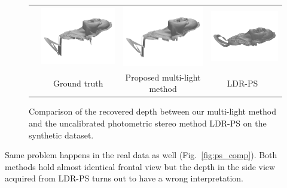 \begin{figure}[!ht]
{\begin{tabular}{c c c c}
   \multirow{-6}{*}{\parbox[t]{2.5mm}{}} &    
   \includegraphics[height = 0.22\linewidth]{figures/result/ps2_gt.pdf} 
   &
   \includegraphics[height = 0.22\linewidth]{figures/result/ps2_robust.pdf} &
   \includegraphics[height = 0.22\linewidth]{figures/result/ps2_LDR.pdf} \\

  {} & {Ground truth} & {Proposed multi-light method}  & {LDR-PS~\cite{favaro2012closed}}
 \end{tabular}}
\caption{Comparison of the recovered depth between our multi-light method and the uncalibrated photometric stereo method LDR-PS on the synthetic dataset.}
\label{fig:ps_comp_syn}
\end{figure}


Same problem happens in the real data as well (Fig.~\ref{fig:ps_comp}). 
Both methods hold almost identical frontal view but the depth in the side view acquired from LDR-PS turns out to have a wrong interpretation. 


